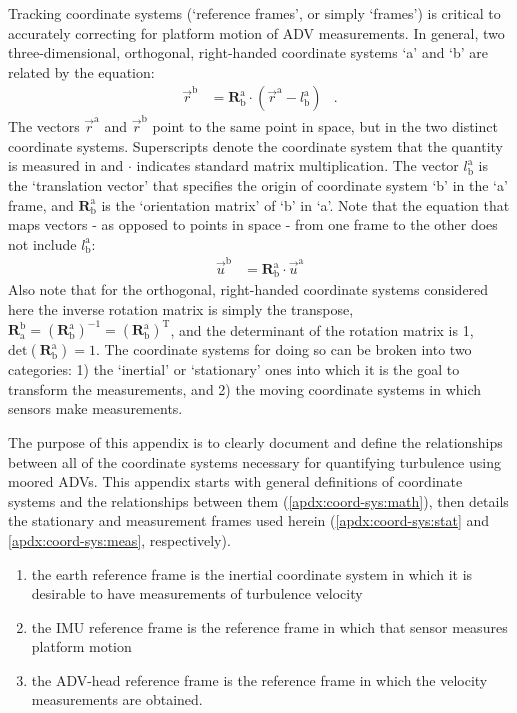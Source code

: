 \documentclass[twocol]{ametsoc}
\begin{document}
\def\a{\ensuremath{\mathrm{a}}}
\def\b{\ensuremath{\mathrm{b}}}
\def\lab{\ensuremath{l_\b^\a}}
\def\xa{\ensuremath{\vec{r}^\a}}
\def\xb{\ensuremath{\vec{r}^\b}}
\def\Rba{\ensuremath{\mathbf{R}^\a_\b}}

Tracking coordinate systems (`reference frames', or simply `frames') is critical to accurately correcting for platform motion of ADV measurements. In general, two three-dimensional, orthogonal, right-handed coordinate systems `a' and `b' are related by the equation:
\begin{align*}
  \xb &= \Rba \cdot (\xa - \lab) & .
\end{align*}
The vectors $\xa$ and $\xb$ point to the same point in space, but in the two distinct coordinate systems.  Superscripts denote the coordinate system that the quantity is measured in and $\cdot$ indicates standard matrix multiplication.  The vector $\lab$ is the `translation vector' that specifies the origin of coordinate system `b' in the `a' frame, and $\mathbf{R}^\mathrm{a}_\mathrm{b}$ is the `orientation matrix' of `b' in `a'. Note that the equation that maps vectors - as opposed to points in space - from one frame to the other does not include $\lab$:
\begin{align}
  \vec{u}^\mathrm{b} & = \Rba \cdot \vec{u}^\mathrm{a}
\end{align}
Also note that for the orthogonal, right-handed coordinate systems considered here the inverse rotation matrix is simply the transpose, $\mathbf{R}^{\mathrm{b}}_{\mathrm{a}}  = (\Rba)^{-1} = (\Rba)^\mathrm{T} $, and the determinant of the rotation matrix is 1, $\mathrm{det}(\Rba ) = 1$.
The coordinate systems for doing so can be broken into two categories: 1) the `inertial' or `stationary' ones into which it is the goal to transform the measurements, and 2) the moving coordinate systems in which sensors make measurements. 

The purpose of this appendix is to clearly document and define the relationships between all of the coordinate systems necessary for quantifying turbulence using moored ADVs.  This appendix starts with general definitions of coordinate systems and the relationships between them (\ref{apdx:coord-sys:math}), then details the stationary and measurement frames used herein (\ref{apdx:coord-sys:stat} and \ref{apdx:coord-sys:meas}, respectively).

\begin{enumerate}
\item the earth reference frame is the inertial coordinate system in
which it is desirable to have measurements of turbulence velocity
\item the IMU reference frame is the reference frame in which that
sensor measures platform motion
\item the ADV-head reference frame is the reference frame in which the
velocity measurements are obtained.
\end{enumerate}
\end{document}
